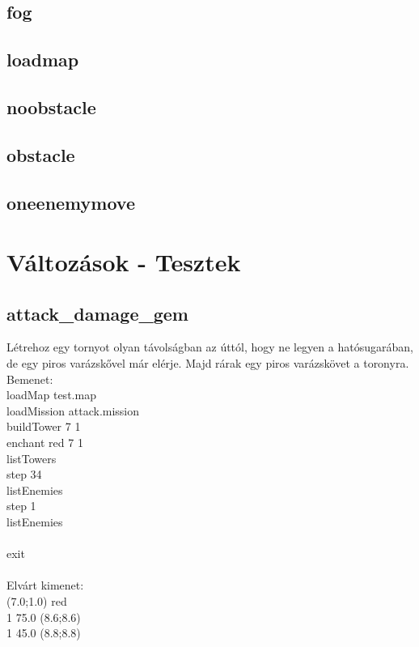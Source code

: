 
\subsection{fog}


\subsection{loadmap}


\subsection{noobstacle}


\subsection{obstacle}


\subsection{oneenemymove}


\section{Változások - Tesztek}
\subsection{attack\_damage\_gem}
Létrehoz egy tornyot olyan távolságban az úttól, hogy ne legyen a hatósugarában, de egy piros varázskővel már elérje.
Majd rárak egy piros varázskövet a toronyra.\\
Bemenet:\\
loadMap test.map\\
loadMission attack.mission\\
buildTower 7 1\\
enchant red 7 1\\
listTowers\\
step 34\\
listEnemies\\
step 1\\
listEnemies\\
\\
exit\\ \\
Elvárt kimenet:\\
(7.0;1.0) red \\
1 75.0 (8.6;8.6) \\
1 45.0 (8.8;8.8) \\
\\
